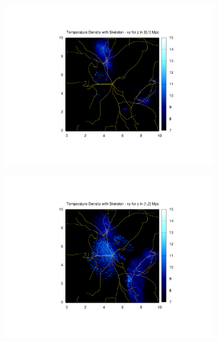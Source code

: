 \documentclass[journal]{IEEEtran}
\begin{document}
\begin{figure}[!t]
	\begin{subfigure}[t]{0.3\textwidth}
		\centering
		\includegraphics[width=\linewidth]{TempDenSkel01}
	\end{subfigure}
	\quad
	\begin{subfigure}[t]{0.3\textwidth}
		\centering
		\includegraphics[width=\linewidth]{TempDenSkel02}
	\end{subfigure}
	\quad
	\begin{subfigure}[t]{0.3\textwidth}
		\centering

\end{subfigure}
\end{figure}
\end{document}
